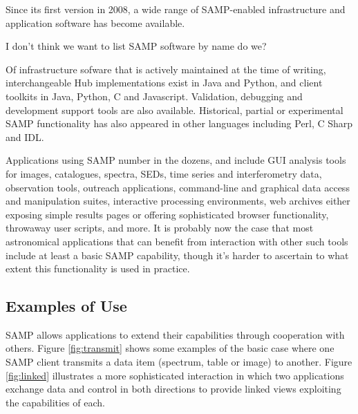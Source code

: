\documentclass[5p]{elsarticle}
\newcommand{\todo}{\color{gray}}
\begin{document}
Since its first version in 2008, a wide range of SAMP-enabled
infrastructure and application software has become available.

{\todo I don't think we want to list SAMP software by name do we?}

Of infrastructure sofware that is actively maintained at the time of writing,
interchangeable Hub implementations exist in Java and Python,
and client toolkits in Java, Python, C and Javascript.
Validation, debugging and development support tools are also available.
Historical, partial or experimental SAMP functionality has
also appeared in other languages including Perl, C Sharp and IDL.

Applications using SAMP number in the dozens, and include
GUI analysis tools for images, catalogues, spectra, SEDs,
time series and interferometry data,
observation tools,
outreach applications,
command-line and graphical data access and manipulation suites,
interactive processing environments,
web archives either exposing simple results pages
or offering sophisticated browser functionality,
throwaway user scripts,
and more.
It is probably now the case that most astronomical applications
that can benefit from interaction with other such tools
include at least a basic SAMP capability,
though it's harder to ascertain to what extent
this functionality is used in practice.

\subsection{Examples of Use} \label{sec:examples}

SAMP allows applications to extend their capabilities through
cooperation with others.
Figure \ref{fig:transmit} shows some examples of
the basic case where one SAMP client transmits a data item
(spectrum, table or image) to another.
Figure \ref{fig:linked} illustrates a more sophisticated
interaction in which two applications exchange data and control
in both directions to provide linked views exploiting the
capabilities of each.
\end{document}
